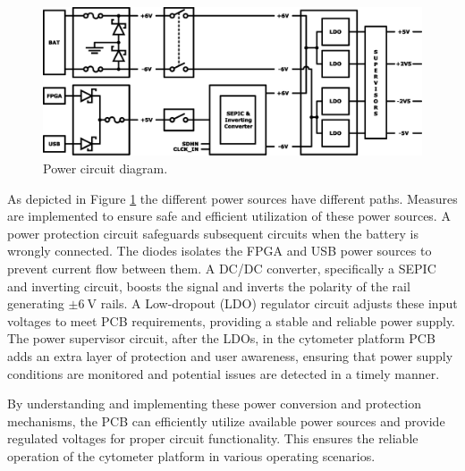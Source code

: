 \begin{figure}[!ht]
    \centering
    \includegraphics[width=.475\textwidth]{figs/power.eps}
    \caption{Power circuit diagram.}
    \label{fig:pwr-sources}
\end{figure}

As depicted in Figure \ref{fig:pwr-sources} the different power sources have different paths. Measures are implemented to ensure safe and efficient utilization of these power sources. A power protection circuit safeguards subsequent circuits when the battery is wrongly connected. The diodes isolates the FPGA and USB power sources to prevent current flow between them. A DC/DC converter, specifically a SEPIC and inverting circuit, boosts the signal and inverts the polarity of the rail generating $\mathrm{\pm6~V}$ rails. A Low-dropout (LDO) regulator circuit adjusts these input voltages to meet PCB requirements, providing a stable and reliable power supply. The power supervisor circuit, after the LDOs, in the cytometer platform PCB adds an extra layer of protection and user awareness, ensuring that power supply conditions are monitored and potential issues are detected in a timely manner.

By understanding and implementing these power conversion and protection mechanisms, the PCB can efficiently utilize available power sources and provide regulated voltages for proper circuit functionality. This ensures the reliable operation of the cytometer platform in various operating scenarios.

